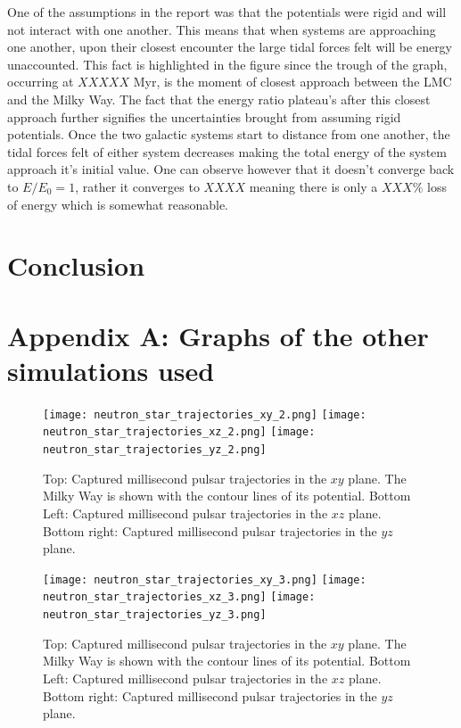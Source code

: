 One of the assumptions in the report was that the potentials were rigid and will not interact with one another. This means that when systems are approaching one another, upon their closest encounter the large tidal forces felt will be energy unaccounted. This fact is highlighted in the figure since the trough of the graph, occurring at $XXXXX$ Myr, is the moment of closest approach between the LMC and the Milky Way. The fact that the energy ratio plateau's after this closest approach further signifies the uncertainties brought from assuming rigid potentials. Once the two galactic systems start to distance from one another, the tidal forces felt of either system decreases making the total energy of the system approach it's initial value. One can observe however that it doesn't converge back to $E/E_0 = 1$, rather it converges to $XXXX$ meaning there is only a $XXX\%$ loss of energy which is somewhat reasonable.

\section{Conclusion}\label{Conclusion}
\setcounter{figure}{0} 


\newpage


\newpage
\section*{Appendix A: Graphs of the other simulations used}\label{AppA}
\renewcommand{\thefigure}{A.\arabic{figure}}
\setcounter{figure}{0}

\begin{figure}[H]
\centering
\texttt{[image: neutron\_star\_trajectories\_xy\_2.png]}
\texttt{[image: neutron\_star\_trajectories\_xz\_2.png]}
\texttt{[image: neutron\_star\_trajectories\_yz\_2.png]}
\caption{Top: Captured millisecond pulsar trajectories in the $xy$ plane. The Milky Way is shown with the contour lines of its potential. Bottom Left: Captured millisecond pulsar trajectories in the $xz$ plane. Bottom right: Captured millisecond pulsar trajectories in the $yz$ plane.}
\label{Simulation2}
\end{figure}

\begin{figure}[H]
\centering
\texttt{[image: neutron\_star\_trajectories\_xy\_3.png]}
\texttt{[image: neutron\_star\_trajectories\_xz\_3.png]}
\texttt{[image: neutron\_star\_trajectories\_yz\_3.png]}
\caption{Top: Captured millisecond pulsar trajectories in the $xy$ plane. The Milky Way is shown with the contour lines of its potential. Bottom Left: Captured millisecond pulsar trajectories in the $xz$ plane. Bottom right: Captured millisecond pulsar trajectories in the $yz$ plane.}
\label{Simulation3}
\end{figure}

